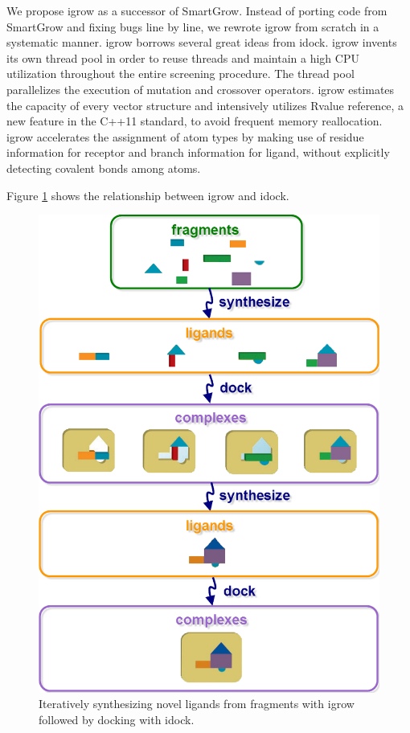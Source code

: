 We propose igrow as a successor of SmartGrow. Instead of porting code from SmartGrow and fixing bugs line by line, we rewrote igrow from scratch in a systematic manner. igrow borrows several great ideas from idock. igrow invents its own thread pool in order to reuse threads and maintain a high CPU utilization throughout the entire screening procedure. The thread pool parallelizes the execution of mutation and crossover operators. igrow estimates the capacity of every vector structure and intensively utilizes Rvalue reference, a new feature in the C++11 standard, to avoid frequent memory reallocation. igrow accelerates the assignment of atom types by making use of residue information for receptor and branch information for ligand, without explicitly detecting covalent bonds among atoms.

Figure \ref{igrow:ComputationalSynthesis} shows the relationship between igrow and idock.

\begin{figure}
\centering
\includegraphics[width=\textwidth]{igrow/ComputationalSynthesis.png}
\caption{Iteratively synthesizing novel ligands from fragments with igrow followed by docking with idock.}
\label{igrow:ComputationalSynthesis}
\end{figure}


